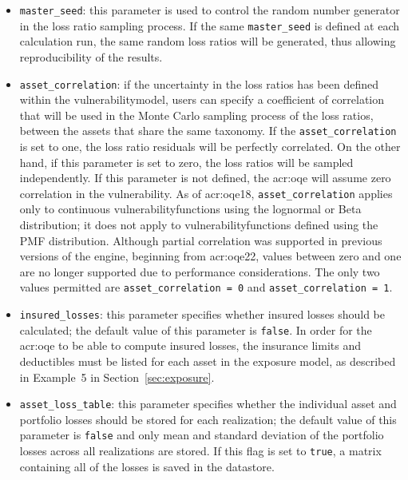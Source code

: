 \begin{itemize}

  \item \Verb+master_seed+: this parameter is used to control the random
    number generator in the loss ratio sampling process. If the same
    \Verb+master_seed+ is defined at each calculation run, the same random loss
    ratios will be generated, thus allowing reproducibility of the results.

  \item \Verb+asset_correlation+: if the uncertainty in the loss ratios
    has been defined within the \gls{vulnerabilitymodel}, users can specify
    a coefficient of correlation that will be used in the Monte Carlo sampling
    process of the loss ratios, between the assets that share the same
    \gls{taxonomy}. If the \Verb+asset_correlation+ is set to one,
    the loss ratio residuals will be perfectly correlated. On the other hand,
    if this parameter is set to zero, the loss ratios will be sampled
    independently. If this parameter is not defined, the
    \glsdesc{acr:oqe} will assume zero correlation in the vulnerability. As of
    \glsdesc{acr:oqe18}, \Verb+asset_correlation+ applies only to continuous
    \glspl{vulnerabilityfunction} using the lognormal or Beta distribution; 
    it does not apply to \glspl{vulnerabilityfunction} defined using the PMF
    distribution. Although partial correlation was supported in previous
    versions of the engine, beginning from \glsdesc{acr:oqe22}, values between
    zero and one are no longer supported due to performance considerations. The
    only two values permitted are \Verb+asset_correlation = 0+ and 
    \Verb+asset_correlation = 1+.

  \item \Verb+insured_losses+: this parameter specifies whether insured losses
    should be calculated; the default value of this parameter is \Verb+false+.
    In order for the \glsdesc{acr:oqe} to be able to compute insured losses, the
    insurance limits and deductibles must be listed for each asset in the 
    exposure model, as described in Example~5 in Section~\ref{sec:exposure}.

  \item \Verb+asset_loss_table+: this parameter
    specifies whether the individual asset and portfolio losses should be
    stored for each realization; the default value of this parameter is
    \Verb+false+ and only mean and standard deviation of the portfolio losses
    across all realizations are stored. If this flag is set to \Verb+true+, a
    matrix containing all of the losses is saved in the datastore.

\end{itemize}

